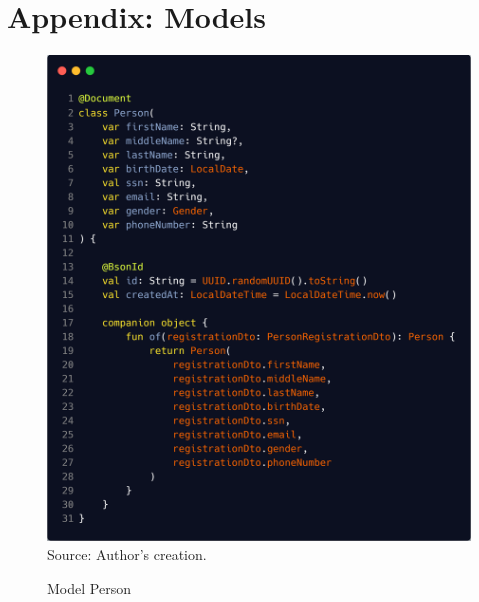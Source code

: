 \section{Appendix: Models}
\label{appendix:models}

\begin{figure}[HContext]
	\centering
	\caption{Model Person}
	\includegraphics[width=1\linewidthContext]{figures/person}
	\label{fig:person}
	\footnotesize Source: Author's creation.
\end{figure}

